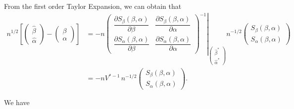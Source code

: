 \documentclass[UTF8,a4paper,10pt]{article}
\begin{document}
From the first order Taylor Expansion, we can obtain that
\begin{equation*}
  \begin{aligned}
    n^{1/2}\left[\left(\begin{array}{l}\hat{\beta} \\ \hat{\alpha}\end{array}\right)-\left(\begin{array}{c}\beta \\ \alpha\end{array}\right)\right] 
&=
-n
\left.\left(\begin{array}{ll}\dfrac{\partial S_{\beta}(\beta, \alpha)}{\partial \beta} & \dfrac{\partial S_{\beta}(\beta, \alpha)}{\partial \alpha} \\ \dfrac{\partial S_{\alpha}(\beta, \alpha)}{\partial \beta} & \dfrac{\partial S_{\alpha}(\beta, \alpha)}{\partial \alpha}\end{array}\right)^{-1}\right|_{\begin{pmatrix}\left.\hat{\beta}^{*}\right. \\ \hat{\alpha}^{*}\end{pmatrix}}
n^{-1/2}
\left(\begin{array}{l}S_{\beta}(\beta, \alpha) \\ S_{\alpha}(\beta, \alpha)\end{array}\right)\\
& = -n
V^{* -1}\,
n^{-1/2}
\left(\begin{array}{l}S_{\beta}(\beta, \alpha) \\ S_{\alpha}(\beta, \alpha)\end{array}\right).
  \end{aligned}
\end{equation*}

We have
\end{document}
